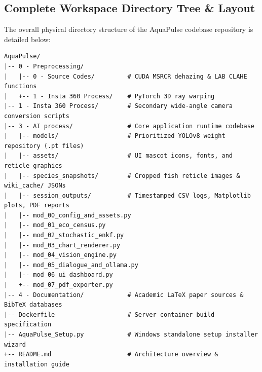 \documentclass[11pt,a4paper]{article}
\begin{document}
\subsection{Complete Workspace Directory Tree \& Layout}
\label{sec:app_tree}
The overall physical directory structure of the AquaPulse codebase repository is detailed below:

\begin{verbatim}
AquaPulse/
|-- 0 - Preprocessing/
|   |-- 0 - Source Codes/         # CUDA MSRCR dehazing & LAB CLAHE functions
|   +-- 1 - Insta 360 Process/    # PyTorch 3D ray warping
|-- 1 - Insta 360 Process/        # Secondary wide-angle camera conversion scripts
|-- 3 - AI process/               # Core application runtime codebase
|   |-- models/                   # Prioritized YOLOv8 weight repository (.pt files)
|   |-- assets/                   # UI mascot icons, fonts, and reticle graphics
|   |-- species_snapshots/        # Cropped fish reticle images & wiki_cache/ JSONs
|   |-- session_outputs/          # Timestamped CSV logs, Matplotlib plots, PDF reports
|   |-- mod_00_config_and_assets.py
|   |-- mod_01_eco_census.py
|   |-- mod_02_stochastic_enkf.py
|   |-- mod_03_chart_renderer.py
|   |-- mod_04_vision_engine.py
|   |-- mod_05_dialogue_and_ollama.py
|   |-- mod_06_ui_dashboard.py
|   +-- mod_07_pdf_exporter.py
|-- 4 - Documentation/            # Academic LaTeX paper sources & BibTeX databases
|-- Dockerfile                    # Server container build specification
|-- AquaPulse_Setup.py            # Windows standalone setup installer wizard
+-- README.md                     # Architecture overview & installation guide
\end{verbatim}
\end{document}

